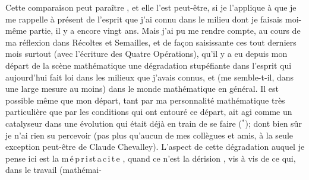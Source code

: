 Cette comparaison peut paraître , et elle l'est peut-être, si je l'applique à  que je me rappelle à présent de l'esprit que j'ai connu dans le milieu  dont je faisais moi-même partie, il y a encore vingt ans. Mais  j'ai pu me rendre compte, au cours de ma réflexion\deleted{\unsure{,}}  dans Récoltes et Semailles, et de façon saisissante ces tout derniers mois surtout (avec l'écriture des Quatre Opérations), qu'il y a eu depuis mon départ de la scène mathématique une  dégradation stupéfiante dans l'esprit qui aujourd'hui fait loi dans les milieux que j'avais connus, et (me semble-t-il, dans une large mesure au moins) dans le monde mathématique en général. Il est possible même que mon départ, tant par ma personnalité mathématique très particulière que par les conditions qui ont entouré ce départ, ait agi comme un catalyseur dans une évolution qui était déjà en train de se faire ($^{\ast}$);   dont bien sûr je n'ai rien su percevoir (pas plus qu'aucun de mes collègues et amis, à la seule exception peut-être de Claude Chevalley). L'aspect de cette dégradation  auquel je pense ici est la  \mbox{m\,é\,p\,r\,i\,s}\quad\mbox{t\,a\,c\,i\,t\,e} ,  quand ce n'est la dérision   , vis à vis de ce qui, dans le travail (mathémai-


